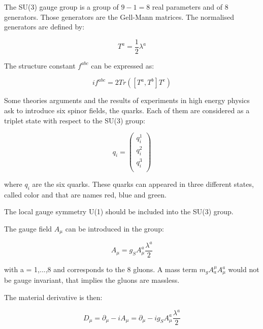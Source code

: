     The SU(3) gauge group is a group of $9 - 1 = 8$ real parameters and of 8 generators. 
    Those generators are the Gell-Mann matrices. 
    The normalised generators are defined by: 
    
    \begin{equation}
        T^a = \frac{1}{2}\lambda^a
    \end{equation}

    The structure constant $f^{abc}$ can be expressed as:

    \begin{equation}
        if^{abc} = 2 Tr([T^a,T^b]T^c)
    \end{equation}
     
    Some theories arguments and the results of experiments in high energy physics ask to introduce six spinor fields, the quarks.
    Each of them are considered as a triplet state with respect to the SU(3) group:

    \begin{equation}
      q_i = 
        \begin{pmatrix}
          q_i^1 \\
          q_i^2 \\
          q_i^3 \\
        \end{pmatrix}
     \end{equation}
    
    where $q_i$ are the six quarks.
    These quarks can appeared in three different states, called color and that are names red, blue and green.

    The local gauge symmetry U(1) should be included into the SU(3) group.
    
    The gauge field $A_{\mu}$ can be introduced in the group:
    
    \begin{equation}
      A_{\mu} = g_S A^a_{\mu}\frac{\lambda^a}{2}
    \end{equation}
     
    with a = 1,...,8 and corresponds to the 8 gluons.
    A mass term  $m_g A^{\mu}_a A^a_{\mu}$ would not be gauge invariant, that implies the gluons are massless.

    The material derivative is then:

    \begin{equation}
      D_{\mu} = \partial_{\mu} - i A_{\mu} = \partial_{\mu} - i g_S A^a_{\mu} \frac{\lambda^a}{2}
    \end{equation}

